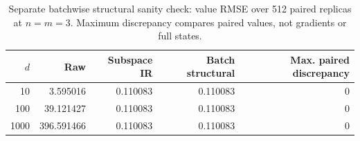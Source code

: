 \begin{table}[htbp]
\centering\small
\caption{Separate batchwise structural sanity check: value RMSE over 512 paired replicas at $n=m=3$. Maximum discrepancy compares paired values, not gradients or full states.}\label{tab:extended-sanity}
\begin{tabular}{@{}rrrrr@{}}
\toprule
$d$ & Raw & Subspace IR & Batch structural & Max. paired discrepancy\\
\midrule
10 & 3.595016 & 0.110083 & 0.110083 & 0\\
100 & 39.121427 & 0.110083 & 0.110083 & 0\\
1000 & 396.591466 & 0.110083 & 0.110083 & 0\\
\bottomrule
\end{tabular}
\end{table}
